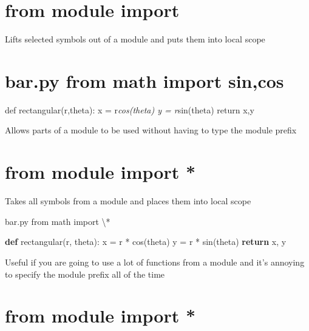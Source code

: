 \documentclass[
  letterpaper,
  DIV=11,
  numbers=noendperiod]{scrreprt}
\newenvironment{Shaded}{\begin{snugshade}}{\end{snugshade}}
\newcommand{\ControlFlowTok}[1]{\textcolor[rgb]{0.00,0.23,0.31}{\textbf{#1}}}
\newcommand{\KeywordTok}[1]{\textcolor[rgb]{0.00,0.23,0.31}{\textbf{#1}}}
\newcommand{\NormalTok}[1]{\textcolor[rgb]{0.00,0.23,0.31}{#1}}
\newcommand{\OperatorTok}[1]{\textcolor[rgb]{0.37,0.37,0.37}{#1}}
\begin{document}

\chapter{from module import}\label{from-module-import}

Lifts selected symbols out of a module and puts them into local scope


\chapter{bar.py from math import
sin,cos}\label{bar.py-from-math-import-sincos}

def rectangular(r,theta): x = r\emph{cos(theta) y = r}sin(theta) return
x,y

Allows parts of a module to be used without having to type the module
prefix


\chapter{from module import *}\label{from-module-import-1}

Takes all symbols from a module and places them into local scope

\begin{Shaded}
\begin{Highlighting}[]
\NormalTok{bar.py from math import \textbackslash{}* }
\end{Highlighting}
\end{Shaded}

\begin{Shaded}
\begin{Highlighting}[]
\KeywordTok{def}\NormalTok{ rectangular(r, theta):}
\NormalTok{    x }\OperatorTok{=}\NormalTok{ r }\OperatorTok{*}\NormalTok{ cos(theta)}
\NormalTok{    y }\OperatorTok{=}\NormalTok{ r }\OperatorTok{*}\NormalTok{ sin(theta)}
    \ControlFlowTok{return}\NormalTok{ x, y }
\end{Highlighting}
\end{Shaded}

Useful if you are going to use a lot of functions from a module and it's
annoying to specify the module prefix all of the time


\chapter{from module import *}\label{from-module-import-2}
\end{document}
